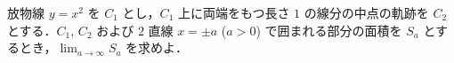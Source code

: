 \documentclass[../../main.tex]{subfiles}
\begin{document}
放物線 $y=x^2$ を $C_1$ とし，$C_1$ 上に両端をもつ長さ $1$ の線分の中点の軌跡を $C_2$ とする．$C_1$, $C_2$ および $2$ 直線 $x=\pm a$ ($a>0$) で囲まれる部分の面積を $S_a$ とするとき，$\displaystyle \lim_{a \to \infty} S_a$ を求めよ．
\end{document}
